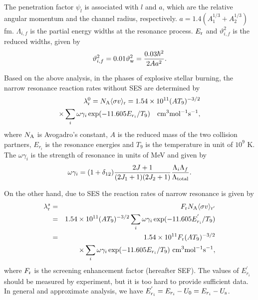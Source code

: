 \documentclass[manuscript]{aastex}
\begin{document}
The penetration factor $\psi_{l}$ is associated with $l$ and $a$,
which are the relative angular momentum and the channel radius,
respectively. $a=1.4(A_1^{1/3}+A_2^{1/3})$ fm. $\Lambda_{i,f}$ is
the partial energy widths at the resonance process. $E_{\rm{r}}$ and
$\vartheta_{i,f}^2$ is the reduced widths, given by
\begin{equation}
 \vartheta_{i,f}^2=0.01\vartheta_{\rm{w}}^2=\frac{0.03\hbar^2}{2Aa^2}.
\label{38}
\end{equation}

Based on the above analysis, in the phases of explosive stellar
burning, the narrow resonance reaction rates without SES are
determined by \citep{Schatz98, Herndl98}
\begin{eqnarray}
 \lambda_{\rm{r}}^0=N_{\rm{A}}\langle{\sigma v}\rangle_{\rm{r}}=1.54\times10^{11}(AT_9)^{-3/2}\nonumber\\
 \times \sum_{i} \omega \gamma_{i}\exp(-11.605E_{r_{i}}/T_9)~~~\rm{cm^3 mol^{-1} s^{-1}},
\label{39}
\end{eqnarray}
where $N_{\rm{A}}$ is Avogadro's constant, $A$ is the reduced mass
of the two collision partners, $E_{r_i}$ is the resonance energies
and $T_9$ is the temperature in unit of $10^9$ K. The $\omega
\gamma_{i}$ is the strength of resonance in units of MeV and given
by
\begin{equation}
 \omega \gamma_{i}=(1+\delta_{12})\frac{2J+1}{(2J_1+1)(2J_2+1)}\frac{\Lambda_{i}\Lambda_{f}}{\Lambda_{\rm{total}}}.
\label{40}
\end{equation}

On the other hand, due to SES the reaction rates of narrow resonance
is given by
\begin{eqnarray}
 \lambda_{\rm{r}}^s&=&F_{\rm{r}} N_{\rm{A}}\langle{\sigma v}\rangle_{\rm{{r'}}} \nonumber\\
 &=&1.54\times10^{11}(AT_9)^{-3/2}\sum_{i} \omega \gamma_{i}\exp(-11.605 E^{'}_{r_i}/T_9) \nonumber\\
 &=&1.54\times10^{11}F_{\rm{r}} (AT_9)^{-3/2}\nonumber\\
 &&\times \sum_{i} \omega \gamma_{i} \exp(-11.605 E_{r_i}/T_9)  ~\rm{cm^3 mol^{-1} s^{-1}},
\label{41}
\end{eqnarray}
where $F_{\rm{r}}$ is the screening enhancement factor (hereafter
SEF). The values of $E^{'}_{r_i}$ should be measured by experiment,
but it is too hard to provide sufficient data. In general and
approximate analysis, we have
$E^{'}_{r_i}=E_{r_i}-U_0=E_{r_i}-U_{\rm{s}}$.
\end{document}
